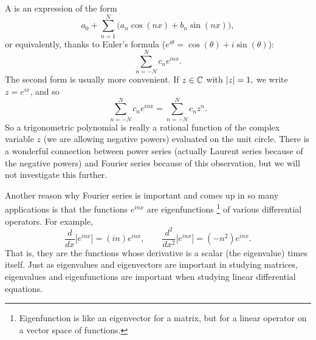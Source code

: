 A \emph{} is an expression of the form
\begin{equation*}
a_0 + \sum_{n=1}^N \bigl(a_n \cos(nx) + b_n \sin(nx) \bigr),
\end{equation*}
or equivalently, thanks to Euler's formula ($e^{i\theta} = \cos(\theta) + i
\sin(\theta)$):
\begin{equation*}
\sum_{n=-N}^N c_n e^{inx} .
\end{equation*}
The second form is usually more convenient.  If
$z \in {\mathbb{C}}$ with $\lvert {z} \rvert=1,$ we write $z = e^{ix}$, and so
\begin{equation*}
\sum_{n=-N}^N c_n e^{inx} = 
\sum_{n=-N}^N c_n z^n .
\end{equation*}
So a trigonometric polynomial is really a rational function
of the complex variable $z$
(we are allowing negative powers) evaluated on the unit circle.  There is
a wonderful connection between power series (actually Laurent series because
of the negative powers) and
Fourier series because of this observation,
but we will not investigate this further.

\medskip

Another reason why Fourier series is important and comes up in so many
applications is that the functions $e^{inx}$ are eigenfunctions%
\footnote{Eigenfunction is like an eigenvector for a matrix, but for a linear
operator on a vector space of functions.} of various
differential operators.  For example,
\begin{equation*}
\frac{d}{dx} \bigl[ e^{inx} \bigr] = (in) e^{inx}, \qquad
\frac{d^2}{dx^2} \bigl[ e^{inx} \bigr] = (-n^2) e^{inx} .
\end{equation*}
That is, they are the functions whose derivative is a scalar (the
eigenvalue) times itself.
Just as eigenvalues and eigenvectors are important in studying matrices,
eigenvalues and eigenfunctions are important when studying linear
differential equations.

\medskip

